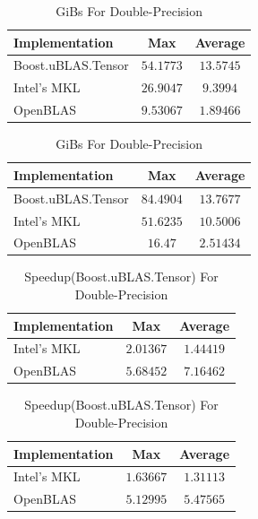 \begin{table}[ht]
    \centering
    \caption{GiBs For Single-Precision}
    \begin{tabular}{|l|c|c|}
        \hline
        \textbf{Implementation} & \textbf{Max} & \textbf{Average}\\
        \hline
        Boost.uBLAS.Tensor  & $54.1773$& $13.5745$ \\
        \hline
        Intel's MKL         & $26.9047$& $9.3994$ \\
        \hline
        OpenBLAS            & $9.53067$& $1.89466$ \\
        \hline
    \end{tabular}

    \vspace*{1 cm}

    \centering
    \caption{GiBs For Double-Precision}
    \begin{tabular}{|l|c|c|}
        \hline
        \textbf{Implementation} & \textbf{Max} & \textbf{Average}\\
        \hline
        Boost.uBLAS.Tensor  & $84.4904$& $13.7677$ \\
        \hline
        Intel's MKL         & $51.6235$& $10.5006$ \\
        \hline
        OpenBLAS            & $16.47$& $2.51434$ \\
        \hline
    \end{tabular}
\end{table}

\begin{table}[ht]
    \centering
    \caption{Speedup(Boost.uBLAS.Tensor) For Single-Precision}
    \begin{tabular}{|l|c|c|}
        \hline
        \textbf{Implementation} & \textbf{Max} & \textbf{Average}\\
        \hline
        Intel's MKL         & $2.01367$& $1.44419$ \\
        \hline
        OpenBLAS            & $5.68452$& $7.16462$ \\
        \hline
    \end{tabular}

    \vspace*{1 cm}

    \centering
    \caption{Speedup(Boost.uBLAS.Tensor) For Double-Precision}
    \begin{tabular}{|l|c|c|}
        \hline
        \textbf{Implementation} & \textbf{Max} & \textbf{Average}\\
        \hline
        Intel's MKL         & $1.63667$& $1.31113$ \\
        \hline
        OpenBLAS            & $5.12995$& $5.47565$ \\
        \hline
    \end{tabular}
\end{table}